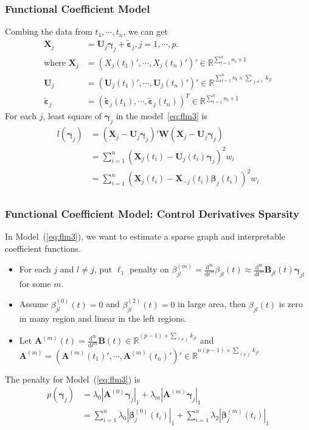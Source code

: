 \documentclass{beamer}
\newcommand{\R}{\mathbb R}
\newcommand{\bX}{\mathbf X}
\newcommand{\bA}{\mathbf A}
\newcommand{\bB}{\mathbf B}
\newcommand{\bU}{\mathbf U}
\newcommand{\bW}{\mathbf W}
\newcommand{\bbeta}{{\boldsymbol{\beta}}}
\newcommand{\bvarepsilon}{\boldsymbol{\varepsilon}}
\newcommand{\bgamma}{\boldsymbol{\gamma}}
\begin{document}
\begin{frame}
	\frametitle{Functional Coefficient Model}
	Combing the data from $t_1, \cdots, t_n$, we can get
	\begin{equation}
	\label{eq:flm3}
	\begin{aligned}
	\bX_j &= \bU_j \bgamma_j + \tilde{\bvarepsilon}_j, j = 1, \cdots, p.\\
	\text{where }\bX_j &= (X_j(t_1)', \cdots, X_j(t_n)')' \in \R^{\sum_{t = 1}^{n}n_t \times 1}\\
	\bU_j &= ( \bU_j(t_1)', \cdots, \bU_j(t_n)' )' \in \R^{\sum_{t = 1}^{n}n_t \times \sum_{\substack{j \neq i}}k_{jl}}\\
	\tilde{\bvarepsilon}_j &= (\tilde{\bvarepsilon}_j(t_1), \cdots, \tilde{\bvarepsilon}_j(t_n))^T \in \R^{\sum_{t = 1}^{n}n_t \times 1}
	\end{aligned}	
	\end{equation}
	For each $j$, least square of $\bgamma_j$ in the model~\ref{eq:flm3} is
	$$\begin{aligned}
	l(\bgamma_j) &= (\bX_j - \bU_j \bgamma_j)'\bW (\bX_j - \bU_j \bgamma_j)\\
	&= \sum_{i = 1}^{n}(\bX_j(t_i) - \bU_j(t_i) \bgamma_j)^2 w_i\\
	&= \sum_{i = 1}^{n}(\bX_j(t_i) - \bX_{-j}(t_i) \bbeta_j(t_i))^2 w_i\\
	\end{aligned}$$
\end{frame}	

\begin{frame}
	\frametitle{Functional Coefficient Model: Control Derivatives Sparsity}
   In Model~(\ref{eq:flm3}), we want to estimate a sparse graph and interpretable coefficient functions. 
   \pause
   \begin{itemize}[<+->]
   	\item For each $j$ and $l \neq j$, put $\ell_1$ penalty on $ \beta_{jl}^{(m)} = \frac{\mathrm{d^m}}{\mathrm{d} t^m} \beta_{jl}(t) \approx \frac{\mathrm{d^m}}{\mathrm{d} t^m} \bB_{jl}(t) \bgamma_{jl}$ for some $m$.
   	\item Assume $\beta_{jl}^{(0)}(t) = 0$ and $\beta_{jl}^{(2)}(t) = 0$ in large area, then $\beta_{jl}(t)$ is zero in many region and linear in the left regions.
   	\item Let $\bA^{(m)}(t) = \frac{\mathrm{d^m}}{\mathrm{d} t^m} \bB(t) \in \R^{(p-1)\times \sum_{\substack{l \neq j}}k_{jl} }$ and $\bA^{(m)} = (\bA^{(m)}(t_1)', \cdots, \bA^{(m)}(t_n)')' \in \R^{n(p-1)\times \sum_{\substack{l \neq j}}k_{jl} }$
   \end{itemize}
   \pause
   The penalty for Model~(\ref{eq:flm3}) is
   $$\begin{aligned}
   p(\bgamma_j) &= \lambda_0|\bA^{(0)} \bgamma_j|_1 + \lambda_m |\bA^{(m)} \bgamma_j|_1\\
   &= \sum_{i=1}^{n}\lambda_0|\bbeta_j^{(0)}(t_i)|_1 + \sum_{i=1}^{n}\lambda_2|\bbeta_j^{(m)}(t_i)|_1
   \end{aligned}$$   
	
\end{frame}	
\end{document}
